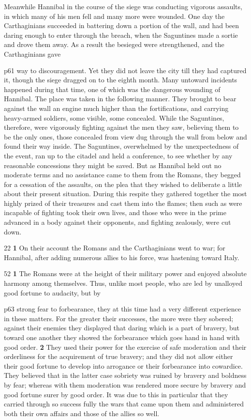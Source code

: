 Meanwhile Hannibal in the course of the siege was conducting vigorous assaults, in which many of his men fell and many more were wounded. One day the Carthaginians succeeded in battering down a portion of the wall, and had been daring enough to enter through the breach, when the Saguntines made a sortie and drove them away. As a result the besieged were strengthened, and the Carthaginians gave

p61 way to discouragement. Yet they did not leave the city till they had captured it, though the siege dragged on to the eighth month. Many untoward incidents happened during that time, one of which was the dangerous wounding of Hannibal. The place was taken in the following manner. They brought to bear against the wall an engine much higher than the fortifications, and carrying heavy-armed soldiers, some visible, some concealed. While the Saguntines, therefore, were vigorously fighting against the men they saw, believing them to be the only ones, those concealed from view dug through the wall from below and found their way inside. The Saguntines, overwhelmed by the unexpectedness of the event, ran up to the citadel\texthebrew{⁠} and held a conference, to see whether by any reasonable concessions they might be saved. But as Hannibal held out no moderate terms and no assistance came to them from the Romans, they begged for a cessation of the assaults, on the plea that they wished to deliberate a little about their present situation. During this respite they gathered together the most highly prized of their treasures and cast them into the flames; then such as were incapable of fighting took their own lives, and those who were in the prime advanced in a body against their opponents, and fighting zealously, were cut down.

22
\textbf{1} On their account the Romans and the Carthaginians went to war; for Hannibal, after adding numerous allies to his force, was hastening toward Italy.

52
\textbf{1} The Romans were at the height of their military power and enjoyed absolute harmony among themselves. Thus, unlike most people, who are led by unalloyed good fortune to audacity, but by

p63 strong fear to forbearance, they at this time had a very different experience in these matters. For the greater their successes, the more were they sobered; against their enemies they displayed that daring which is a part of bravery, but toward one another they showed the forbearance which goes hand in hand with good order. \textbf{2} They used their power for the exercise of safe moderation and their orderliness for the acquirement of true bravery; and they did not allow either their good fortune to develop into arrogance or their forbearance into cowardice. They believed that in the latter case sobriety was ruined by bravery and boldness by fear; whereas with them moderation was rendered more secure by bravery and good fortune surer by good order. It was due to this in particular that they carried through so success ­fully the wars that came upon them and administered both their own affairs and those of the allies so well.

